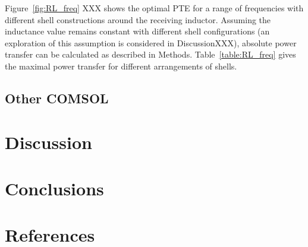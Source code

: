 \documentclass[11pt]{iopart}
\begin{document}
Figure~\ref{fig:RL_freq} XXX shows the optimal PTE for a range of
frequencies with different shell constructions around the receiving
inductor.  Assuming the inductance value remains constant with
different shell configurations (an exploration of this assumption is
considered in DiscussionXXX), absolute power transfer can be
calculated as described in Methods.  Table~\ref{table:RL_freq} gives
the maximal power transfer for different arrangements of shells.\\


\subsection{Other COMSOL}


\section{Discussion}

\section{Conclusions}

\section{References}
\end{document}
